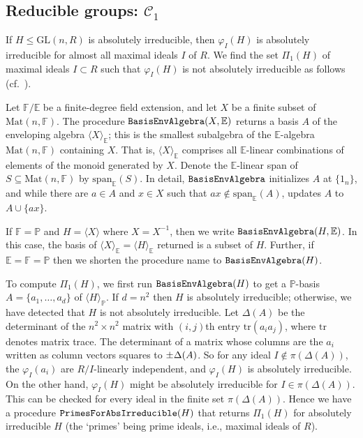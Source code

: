 \documentclass[11pt]{amsart}
\theoremstyle{definition}
\theoremstyle{remark}
\newcommand{\F}{\mathbb{F}}
\renewcommand{\P}{\mathbb{P}}
\newcommand{\GL}{\mathrm{GL}}
\newcommand{\tr}{\mathrm{tr}}
\newcommand{\calc}{\mathscr{C}}
\begin{document}
\subsection{Reducible groups: $\calc_1$} 
\label{Reducible}

If $H\leq \GL(n,R)$ is absolutely irreducible, then $\varphi_I(H)$ 
is absolutely irreducible for almost all maximal ideals $I$ of $R$. 
We find the set $\Pi_1(H)$ of maximal ideals $I\subset R$ such that 
$\varphi_I(H)$ is not absolutely irreducible as follows 
(cf.~\cite[Section~2.2]{ExpMath}).

Let $\F/\mathbb{E}$ be a finite-degree field extension, and let 
$X$ be a finite subset of $\mathrm{Mat}(n,\F)$. The procedure 
${\tt BasisEnvAlgebra} (X, \mathbb{E})$ returns a basis $A$
of the enveloping algebra $\langle  X\rangle_{\mathbb{E}}$; this is 
the smallest subalgebra of the $\mathbb{E}$-algebra $\mathrm{Mat}(n,\F)$
 containing $X$. That is, $\langle X\rangle_{\mathbb{E}}$ comprises 
all $\mathbb{E}$-linear combinations of elements of the monoid generated 
by $X$. Denote the $\mathbb E$-linear span of $S\subseteq\mathrm{Mat}(n,\F)$
by $\mathrm{span}_{\mathbb{E}}(S)$. In detail, $\tt BasisEnvAlgebra$ 
initializes $A$ at $\{ 1_n\}$, and while there are $a \in A$ 
and $x \in X$ such that $ax \notin \mathrm{span}_{\mathbb{E}}(A)$, updates
$A$ to $A\cup \{ax\}$.

If $\F = \P$ and $H=\langle X\rangle$ where $X=X^{-1}$, then we 
write  ${\tt BasisEnvAlgebra}(H, \mathbb{E})$. In this case, the 
basis of $\langle X\rangle_{\mathbb E} =\langle H\rangle_{\mathbb E}$
returned is a subset of $H$. Further, if $\mathbb{E}=\F=\P$ then 
we shorten the procedure name to ${\tt BasisEnvAlgebra}(H)$.

To compute $\Pi_1(H)$, we first run ${\tt BasisEnvAlgebra}(H)$ to 
 get a $\P$-basis $A = \{a_1, \ldots, a_{d}\}$ of 
$\langle H \rangle_{\P}$. If  $d = n^2$ then $H$ is absolutely 
irreducible; otherwise, we have detected that $H$ is not
absolutely irreducible. Let $\Delta(A)$ be the determinant of the 
$n^2 \times n^2$ matrix with $(i,j)$th entry $\tr(a_ia_j)$, where
 $\tr$ denotes matrix trace. The determinant of a matrix 
whose columns are the $a_i$ written as column vectors 
squares to $\pm \hspace{.25pt} \Delta(A)$. So for any ideal 
$I \not \in \pi(\Delta(A))$, the $\varphi_I(a_i)$ are $R/I$-linearly
independent, and $\varphi_I(H)$ is absolutely irreducible. 
On the other hand, $\varphi_I(H)$ might be absolutely irreducible for 
$I \in \pi(\Delta(A))$. This can be checked for every ideal in the 
finite set $\pi(\Delta(A))$. Hence we have a procedure 
${\tt PrimesForAbsIrreducible}(H)$ that returns $\Pi_1(H)$ for 
absolutely irreducible $H$ (the `primes' being prime ideals, i.e., 
maximal ideals of $R$).
\end{document}
